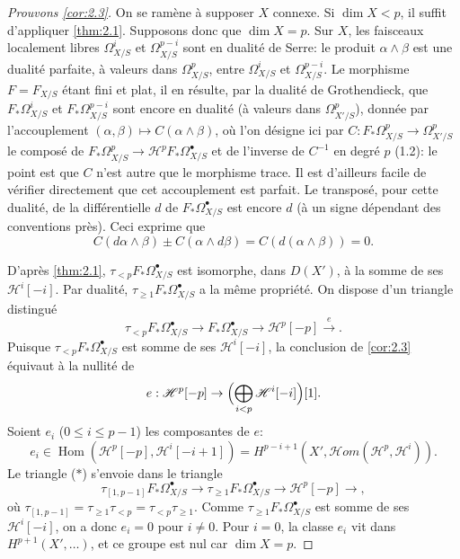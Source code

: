 \documentclass[12pt,a4paper]{article}
\theoremstyle{plain}
\theoremstyle{definition}
\theoremstyle{remark}
\DeclareMathOperator{\Hom}{Hom}
\begin{document}
\begin{proof}[Prouvons \ref{cor:2.3}]
On se ram\`ene \`a supposer $X$ connexe. Si $\dim X < p$, il suffit d'appliquer \ref{thm:2.1}. Supposons donc que $\dim X = p$. Sur $X$, les faisceaux localement libres $\Omega^i_{X/S}$ et $\Omega^{p-i}_{X/S}$ sont en dualit\'e de Serre: le produit $\alpha \wedge \beta$ est une dualit\'e parfaite, \`a valeurs dans $\Omega^p_{X/S}$, entre $\Omega^i_{X/S}$ et $\Omega^{p-i}_{X/S}$. Le morphisme $F = F_{X/S}$ \'etant fini et plat, il en r\'esulte, par la dualit\'e de Grothendieck, que $F_* \Omega^i_{X/S}$ et $F_* \Omega^{p-i}_{X/S}$ sont encore en dualit\'e (\`a valeurs dans $\Omega^p_{X'/S}$), donn\'ee par l'accouplement $(\alpha, \beta) \mapsto C(\alpha \wedge \beta)$, o\`u l'on d\'esigne ici par $C: F_* \Omega^p_{X/S} \to \Omega^p_{X'/S}$ le compos\'e de $F_* \Omega^p_{X/S} \to \mathscr{H}^p F_* \Omega^{\bullet}_{X/S}$ et de l'inverse de $C^{-1}$ en degr\'e $p$ (1.2): le point est que $C$ n'est autre que le morphisme trace. Il est d'ailleurs facile de v\'erifier directement que cet accouplement est parfait. Le transpos\'e, pour cette dualit\'e, de la diff\'erentielle $d$ de $F_* \Omega^{\bullet}_{X/S}$ est encore $d$ (\`a un signe d\'ependant des conventions pr\`es). Ceci exprime que
\[
C(d\alpha \wedge \beta) \pm C(\alpha \wedge d\beta) = C(d(\alpha \wedge \beta)) = 0.
\]

D'apr\`es \ref{thm:2.1}, $\tau_{<p} F_* \Omega^{\bullet}_{X/S}$ est isomorphe, dans $D(X')$, \`a la somme de ses $\mathscr{H}^i[-i]$. Par dualit\'e, $\tau_{\ge 1} F_* \Omega^{\bullet}_{X/S}$ a la m\^eme propri\'et\'e. On dispose d'un triangle distingu\'e
\begin{equation}\label{eq:star}
\tau_{<p} F_* \Omega^{\bullet}_{X/S} \to F_* \Omega^{\bullet}_{X/S} \to \mathscr{H}^p[-p] \xrightarrow{e}.
\tag{$*$}
\end{equation}
Puisque $\tau_{<p} F_* \Omega^{\bullet}_{X/S}$ est somme de ses $\mathscr{H}^i[-i]$, la conclusion de \ref{cor:2.3} \'equivaut \`a la nullit\'e de
\[
e: \mathscr{H}^p[-p] \to \Bigl(\bigoplus_{i < p} \mathscr{H}^i[-i]\Bigr)[1].
\]
Soient $e_i$ ($0 \le i \le p-1$) les composantes de $e$:
\[
e_i \in \Hom(\mathscr{H}^p[-p], \mathscr{H}^i[-i+1]) = H^{p-i+1}(X', \mathscr{H}om(\mathscr{H}^p, \mathscr{H}^i)).
\]
Le triangle ($*$) s'envoie dans le triangle
\[
\tau_{[1,p-1]} F_* \Omega^{\bullet}_{X/S} \to \tau_{\ge 1} F_* \Omega^{\bullet}_{X/S} \to \mathscr{H}^p[-p] \to,
\]
o\`u $\tau_{[1,p-1]} = \tau_{\ge 1} \tau_{<p} = \tau_{<p} \tau_{\ge 1}$. Comme $\tau_{\ge 1} F_* \Omega^{\bullet}_{X/S}$ est somme de ses $\mathscr{H}^i[-i]$, on a donc $e_i = 0$ pour $i \neq 0$. Pour $i = 0$, la classe $e_i$ vit dans $H^{p+1}(X', \ldots)$, et ce groupe est nul car $\dim X = p$.
\end{proof}
\end{document}
